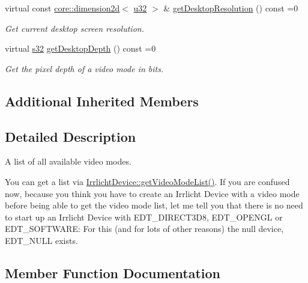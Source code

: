 \begin{DoxyCompactItemize}
virtual const \hyperlink{classirr_1_1core_1_1dimension2d}{core\+::dimension2d}$<$ \hyperlink{namespaceirr_a0416a53257075833e7002efd0a18e804}{u32} $>$ \& \hyperlink{classirr_1_1video_1_1IVideoModeList_ade99f99922307c1d539bdd35834361fa}{get\+Desktop\+Resolution} () const =0
\begin{DoxyCompactList}\small\item\em Get current desktop screen resolution. \end{DoxyCompactList}\item 
virtual \hyperlink{namespaceirr_ac66849b7a6ed16e30ebede579f9b47c6}{s32} \hyperlink{classirr_1_1video_1_1IVideoModeList_a15869ac6919f6f29d2a25fcf13b6dd45}{get\+Desktop\+Depth} () const =0
\begin{DoxyCompactList}\small\item\em Get the pixel depth of a video mode in bits. \end{DoxyCompactList}\end{DoxyCompactItemize}
\subsection*{Additional Inherited Members}


\subsection{Detailed Description}
A list of all available video modes. 

You can get a list via \hyperlink{classirr_1_1IrrlichtDevice_a8872867a5ad728a4673679e9e8f469e7}{Irrlicht\+Device\+::get\+Video\+Mode\+List()}. If you are confused now, because you think you have to create an Irrlicht Device with a video mode before being able to get the video mode list, let me tell you that there is no need to start up an Irrlicht Device with E\+D\+T\+\_\+\+D\+I\+R\+E\+C\+T3\+D8, E\+D\+T\+\_\+\+O\+P\+E\+N\+GL or E\+D\+T\+\_\+\+S\+O\+F\+T\+W\+A\+RE\+: For this (and for lots of other reasons) the null device, E\+D\+T\+\_\+\+N\+U\+LL exists. 

\subsection{Member Function Documentation}
\mbox{\label{classirr_1_1video_1_1IVideoModeList_a15869ac6919f6f29d2a25fcf13b6dd45}} 
